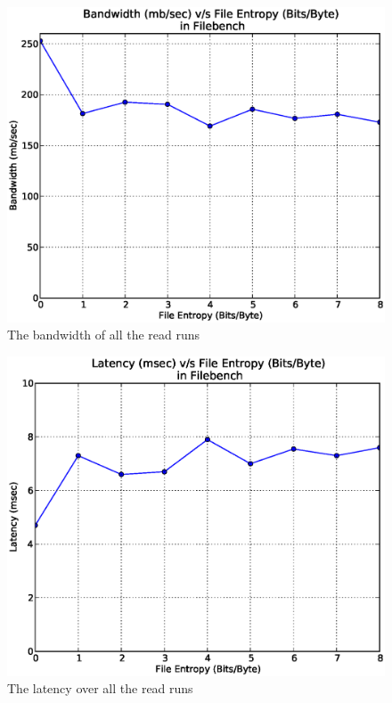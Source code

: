 \begin{figure}[H]
\begin{center}
\includegraphics[scale=0.55]{../results/set1/read_bw.eps}
\caption{The bandwidth of all the read runs }
\label{fig:rb}
\end{center}
\end{figure}

\begin{figure}[H]
\begin{center}
\includegraphics[scale=.55]{../results/set1/read_latency.eps}
\caption{The latency over all the read runs}
\label{fig:rl}
\end{center}
\end{figure}

